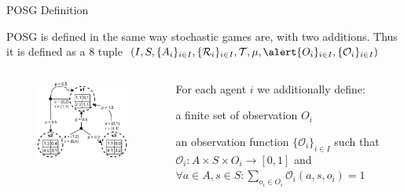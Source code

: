 \begin{frame}{POSG Definition}

POSG is defined in the same way stochastic games are, with two additions. Thus it is defined as a 8 tuple \((I, S, \{A_i\}_{i \in I}, \{\mathcal{R}_i\}_{i \in I}, \mathcal{T}, \mu, \e{\{O_{i}\}_{i \in I}, \{\mathcal{O}_{i}\}_{i \in I}})\)
\vspace{5pt}

\begin{columns}
    \begin{column}{0.5\textwidth}
    \begin{figure}
        \centering
        \includegraphics[width = 0.9\linewidth, keepaspectratio]{images/chapter_3/game-models-posg.pdf}
    \end{figure}
    \end{column}
    \begin{column}{0.5\textwidth}
        For each agent \(i\) we additionally define:
        \blist
            \item a finite set of observation \(O_{i}\)
            \item  an observation function $\{\mathcal{O}_{i}\}_{i \in I}$ such that $\mathcal{O}_i: A \times S \times O_i \to [0, 1]$ and $\forall a \in A, s \in S: \sum_{o_i \in O_i} \mathcal{O}_i (a, s, o_i) = 1$
        \elist
    \end{column}
\end{columns}
\end{frame}

